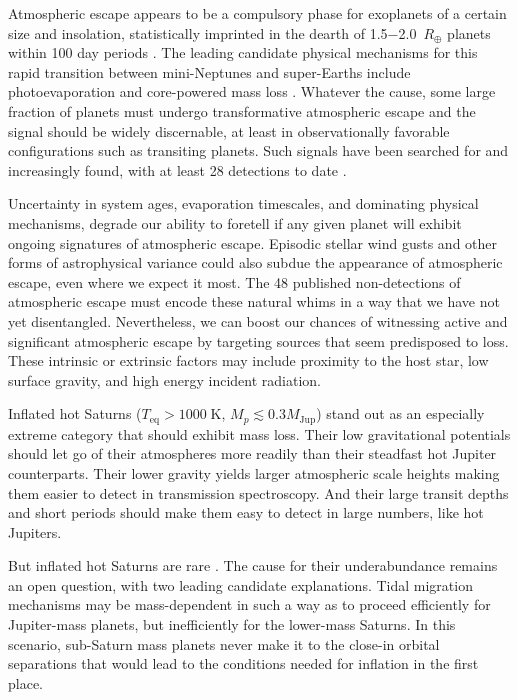 \documentclass[twocolumn]{aastex631}
\begin{document}
Atmospheric escape appears to be a compulsory phase for exoplanets of a certain size and insolation, statistically imprinted in the dearth of 1.5$-$2.0~$R_\oplus$ planets within 100 day periods \citep{2017AJ....154..109F}.  The leading candidate physical mechanisms for this rapid transition between mini-Neptunes and super-Earths include photoevaporation \citep{2013ApJ...775..105O,2013ApJ...776....2L,2017ApJ...847...29O} and core-powered mass loss \citep{2019MNRAS.487...24G}.  Whatever the cause, some large fraction of planets must undergo transformative atmospheric escape and the signal should be widely discernable, at least in observationally favorable configurations such as transiting planets.  Such signals have been searched for and increasingly found, with at least 28 detections to date \citep{2022arXiv221116243D}.

Uncertainty in system ages, evaporation timescales, and dominating physical mechanisms, degrade our ability to foretell if any given planet will exhibit ongoing signatures of atmospheric escape.  Episodic stellar wind gusts and other forms of astrophysical variance could also subdue the appearance of atmospheric escape, even where we expect it most.  The 48 published non-detections of atmospheric escape \citep{2022arXiv221116243D} must encode these natural whims in a way that we have not yet disentangled. Nevertheless, we can boost our chances of witnessing active and significant atmospheric escape by targeting sources that seem predisposed to loss.  These intrinsic or extrinsic factors may include proximity to the host star, low surface gravity, and high energy incident radiation.

Inflated hot Saturns ($T_\mathrm{eq}>1000\;$K, $M_p \lesssim 0.3 M_\mathrm{Jup}$) stand out as an especially extreme category that should exhibit mass loss.  Their low gravitational potentials should let go of their atmospheres more readily than their steadfast hot Jupiter counterparts.  Their lower gravity yields larger atmospheric scale heights making them easier to detect in transmission spectroscopy.  And their large transit depths and short periods should make them easy to detect in large numbers, like hot Jupiters.

But inflated hot Saturns are rare \citep{2018AJ....155..214T}.  The cause for their underabundance remains an open question, with two leading candidate explanations.  Tidal migration mechanisms may be mass-dependent in such a way as to proceed efficiently for Jupiter-mass planets, but inefficiently for the lower-mass Saturns.  In this scenario, sub-Saturn mass planets never make it to the close-in orbital separations that would lead to the conditions needed for inflation in the first place.
\end{document}
